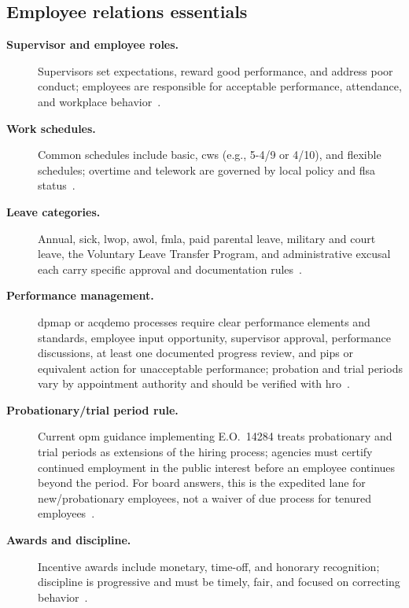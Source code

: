 \documentclass[../main.tex]{subfiles}
\begin{document}
\subsection{Employee relations essentials}
\begin{description}
  \item[\textbf{Supervisor and employee roles.}] Supervisors set expectations, reward good performance,
  and address poor conduct; employees are responsible for acceptable performance, attendance, and
  workplace behavior~\autocite{edo-6-1-4-employee-relations-2025}.
  \item[\textbf{Work schedules.}] Common schedules include basic, \ac{cws} (e.g., 5-4/9 or 4/10), and
  flexible schedules; overtime and telework are governed by local policy and \ac{flsa} status~\autocite{edo-6-1-4-employee-relations-2025,opm-flsa-overtime}.
  \item[\textbf{Leave categories.}] Annual, sick, \ac{lwop}, \ac{awol}, \ac{fmla}, paid parental leave,
  military and court leave, the Voluntary Leave Transfer Program, and administrative excusal each
  carry specific approval and documentation rules~\autocite{edo-6-1-4-employee-relations-2025}.
  \item[\textbf{Performance management.}] \ac{dpmap} or \ac{acqdemo} processes require clear performance
  elements and standards, employee input opportunity, supervisor approval, performance discussions,
  at least one documented progress review, and \acp{pip} or equivalent action for unacceptable
  performance; probation and trial periods vary by appointment authority and should be verified with
  \ac{hro}~\autocite{edo-6-1-4-employee-relations-2025,dodi-1400-25-v431-2025,opm-performance-management-federal-employees-2026,opm-probationary-periods-2025}.
  \item[\textbf{Probationary/trial period rule.}] Current \ac{opm} guidance implementing E.O.~14284 treats probationary and trial periods as extensions of the hiring process; agencies must certify continued employment in the public interest before an employee continues beyond the period. For board answers, this is the expedited lane for new/probationary employees, not a waiver of due process for tenured employees~\autocite{opm-probationary-periods-2025}.
  \item[\textbf{Awards and discipline.}] Incentive awards include monetary, time-off, and honorary
  recognition; discipline is progressive and must be timely, fair, and focused on correcting behavior~\autocite{edo-6-1-4-employee-relations-2025}.
\end{description}
\end{document}
